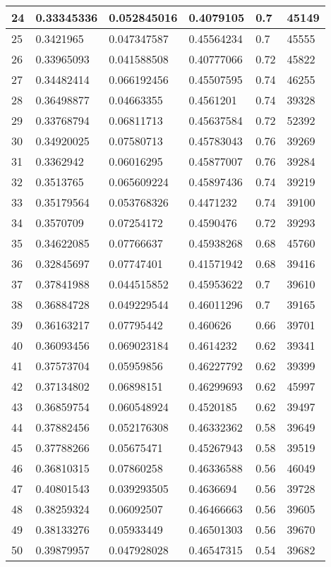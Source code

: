 \begin{longtable}{|l|l|l|l|l|l|}
24 & 0.33345336 & 0.052845016 & 0.4079105 & 0.7 & 45149 \\ \hline 
25 & 0.3421965 & 0.047347587 & 0.45564234 & 0.7 & 45555 \\ \hline 
26 & 0.33965093 & 0.041588508 & 0.40777066 & 0.72 & 45822 \\ \hline 
27 & 0.34482414 & 0.066192456 & 0.45507595 & 0.74 & 46255 \\ \hline 
28 & 0.36498877 & 0.04663355 & 0.4561201 & 0.74 & 39328 \\ \hline 
29 & 0.33768794 & 0.06811713 & 0.45637584 & 0.72 & 52392 \\ \hline 
30 & 0.34920025 & 0.07580713 & 0.45783043 & 0.76 & 39269 \\ \hline 
31 & 0.3362942 & 0.06016295 & 0.45877007 & 0.76 & 39284 \\ \hline 
32 & 0.3513765 & 0.065609224 & 0.45897436 & 0.74 & 39219 \\ \hline 
33 & 0.35179564 & 0.053768326 & 0.4471232 & 0.74 & 39100 \\ \hline 
34 & 0.3570709 & 0.07254172 & 0.4590476 & 0.72 & 39293 \\ \hline 
35 & 0.34622085 & 0.07766637 & 0.45938268 & 0.68 & 45760 \\ \hline 
36 & 0.32845697 & 0.07747401 & 0.41571942 & 0.68 & 39416 \\ \hline 
37 & 0.37841988 & 0.044515852 & 0.45953622 & 0.7 & 39610 \\ \hline 
38 & 0.36884728 & 0.049229544 & 0.46011296 & 0.7 & 39165 \\ \hline 
39 & 0.36163217 & 0.07795442 & 0.460626 & 0.66 & 39701 \\ \hline 
40 & 0.36093456 & 0.069023184 & 0.4614232 & 0.62 & 39341 \\ \hline 
41 & 0.37573704 & 0.05959856 & 0.46227792 & 0.62 & 39399 \\ \hline 
42 & 0.37134802 & 0.06898151 & 0.46299693 & 0.62 & 45997 \\ \hline 
43 & 0.36859754 & 0.060548924 & 0.4520185 & 0.62 & 39497 \\ \hline 
44 & 0.37882456 & 0.052176308 & 0.46332362 & 0.58 & 39649 \\ \hline 
45 & 0.37788266 & 0.05675471 & 0.45267943 & 0.58 & 39519 \\ \hline 
46 & 0.36810315 & 0.07860258 & 0.46336588 & 0.56 & 46049 \\ \hline 
47 & 0.40801543 & 0.039293505 & 0.4636694 & 0.56 & 39728 \\ \hline 
48 & 0.38259324 & 0.06092507 & 0.46466663 & 0.56 & 39605 \\ \hline 
49 & 0.38133276 & 0.05933449 & 0.46501303 & 0.56 & 39670 \\ \hline 
50 & 0.39879957 & 0.047928028 & 0.46547315 & 0.54 & 39682 \\ \hline 
\end{longtable}